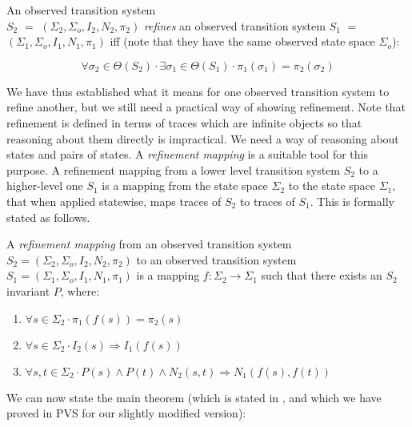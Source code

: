 \begin{definition}[Refinement]
\label{def-refinement}
An observed transition system\\ 
  $S_2$ $=$ $(\Sigma_2,\Sigma_o,I_2,N_2,\pi_2)$ 
{\em refines} an observed transition system   
  $S_1$ $=$ $(\Sigma_1,\Sigma_o,I_1,N_1,\pi_1)$ 
iff (note that they have the same observed state space $\Sigma_o$):

\[
  \forall \sigma_2 \in \Theta(S_2) \cdot 
    \exists \sigma_1 \in \Theta(S_1) \cdot
      \pi_1(\sigma_1) = \pi_2(\sigma_2)
\]
\end{definition}

We have thus established  what it means for one  observed transition
system to refine another, but we still need  a  practical way of
showing refinement.  Note  that 
refinement is defined in terms of traces which are infinite objects
so that reasoning about them directly is impractical.  We need a way  of
reasoning  about states and pairs of states. A {\em refinement mapping} is
a suitable tool for this purpose.  A 
refinement  mapping from  a  lower  level  transition system $S_2$ to   a
higher-level  one $S_1$ is    a mapping from the state space  $\Sigma_2$ to
the  state space $\Sigma_1$, that when applied statewise, 
maps traces of $S_2$ to traces of $S_1$.  This is formally stated as
follows.

\begin{definition}
\label{def-refinement-mapping}
A {\em refinement mapping} from an observed transition system
  $S_2 = (\Sigma_2,\Sigma_o,I_2,N_2,\pi_2)$
to an observed transition system
  $S_1 = (\Sigma_1,\Sigma_o,I_1,N_1,\pi_1)$
is a mapping $f : \Sigma_2 \rightarrow \Sigma_1$ such that there exists an
$S_2$ invariant $P$,  where:

\begin{enumerate}

 \item $\forall s \in \Sigma_2 \cdot \pi_1(f(s)) = \pi_2(s)$

 \item $\forall s \in \Sigma_2 \cdot I_2(s) \Rightarrow I_1(f(s))$

 \item $\forall s,t \in \Sigma_2 \cdot 
          P(s) \wedge P(t) \wedge N_2(s,t) \Rightarrow N_1(f(s),f(t))$ 
       
\end{enumerate}
\end{definition}

We   can now    state   the  main   theorem   (which  is   stated   in
\cite{AL:Mappings}, and which we have proved in  PVS for our slightly
modified version):

